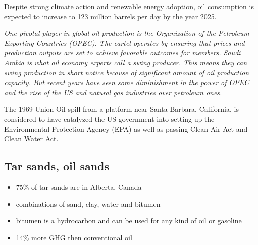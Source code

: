 Despite strong climate action and renewable energy adoption, oil consumption is
expected to increase to 123 million barrels per day by the year 2025.

\textit{
One pivotal player in global oil production is the Organization of the
Petroleum Exporting Countries (OPEC). The cartel operates by ensuring that
prices and production outputs are set to achieve favorable outcomes for
members. Saudi Arabia is what oil economy experts call a swing producer. This
means they can swing production in short notice because of significant amount
of oil production capacity. But recent years have seen some diminishment in
the power of OPEC and the rise of the US and natural gas industries over
petroleum ones.
}

The 1969 Union Oil spill from a platform near Santa Barbara, California, is
considered to have catalyzed the US government into setting up the
Environmental Protection Agency (EPA) as well as passing Clean Air Act and
Clean Water Act.

\subsection{Tar sands, oil sands}

\begin{itemize}
	\item 75\% of tar sands are in Alberta, Canada
	\item combinations of sand, clay, water and bitumen
	\item bitumen is a hydrocarbon and can be used for any kind of oil or
	gasoline
	\item 14\% more GHG then conventional oil
\end{itemize}
